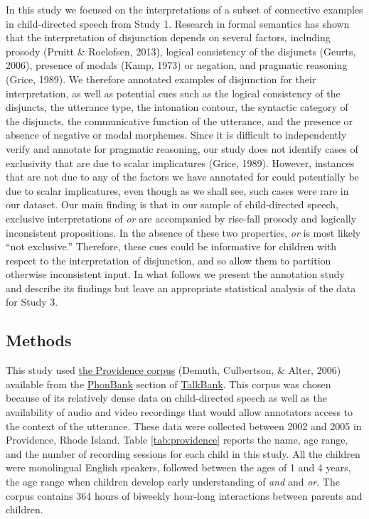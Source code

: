 \documentclass[
  english,
  ,man,floatsintext]{apa6}
\begin{document}
In this study we focused on the interpretations of a subset of connective examples in child-directed speech from Study 1. Research in formal semantics has shown that the interpretation of disjunction depends on several factors, including prosody (Pruitt \& Roelofsen, 2013), logical consistency of the disjuncts (Geurts, 2006), presence of modals (Kamp, 1973) or negation, and pragmatic reasoning (Grice, 1989). We therefore annotated examples of disjunction for their interpretation, as well as potential cues such as the logical consistency of the disjuncts, the utterance type, the intonation contour, the syntactic category of the disjuncts, the communicative function of the utterance, and the presence or absence of negative or modal morphemes. Since it is difficult to independently verify and annotate for pragmatic reasoning, our study does not identify cases of exclusivity that are due to scalar implicatures (Grice, 1989). However, instances that are not due to any of the factors we have annotated for could potentially be due to scalar implicatures, even though as we shall see, such cases were rare in our dataset. Our main finding is that in our sample of child-directed speech, exclusive interpretations of \emph{or} are accompanied by rise-fall prosody and logically inconsistent propositions. In the absence of these two properties, \emph{or} is most likely ``not exclusive.'' Therefore, these cues could be informative for children with respect to the interpretation of disjunction, and so allow them to partition otherwise inconsistent input. In what follows we present the annotation study and describe its findings but leave an appropriate statistical analysis of the data for Study 3.

\hypertarget{methods-1}{%
\subsection{Methods}\label{methods-1}}

This study used \href{https://phonbank.talkbank.org/browser/index.php?url=Eng-NA/Providence/}{the Providence corpus} (Demuth, Culbertson, \& Alter, 2006) available from the \href{https://phonbank.talkbank.org}{PhonBank} section of \href{https://talkbank.org/}{TalkBank}. This corpus was chosen because of its relatively dense data on child-directed speech as well as the availability of audio and video recordings that would allow annotators access to the context of the utterance. These data were collected between 2002 and 2005 in Providence, Rhode Island. Table \ref{tab:providence} reports the name, age range, and the number of recording sessions for each child in this study. All the children were monolingual English speakers, followed between the ages of 1 and 4 years, the age range when children develop early understanding of \emph{and} and \emph{or}. The corpus contains 364 hours of biweekly hour-long interactions between parents and children.
\end{document}
